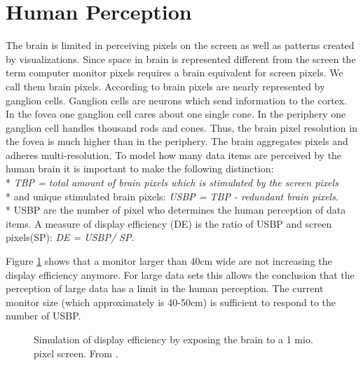\section{Human Perception} \label{perception}
The brain is limited in perceiving pixels on the screen as well as patterns created by visualizations. Since space in brain is represented different from the screen the term computer monitor pixels requires a brain equivalent for screen pixels. We call them brain pixels. According to  \cite{Ware2012a} brain pixels are nearly represented by ganglion cells. Ganglion cells are neurons which send information to the cortex. In the fovea one ganglion cell cares about one single cone. In the periphery one ganglion cell handles thousand rods and cones. Thus, the brain pixel resolution in the fovea is much higher than in the periphery. The brain aggregates pixels and adheres multi-resolution. 
To model how many data items are perceived by the human brain it is important to make the following distinction: 
\\*
\textit{TBP = total amount of brain pixels which is stimulated by the screen pixels}\\*
and unique stimulated brain pixels: \textit{USBP = TBP - redundant brain pixels}.\\*
USBP are the number of pixel who determines the human perception of data items. A measure of display efficiency (DE) is the ratio of USBP and screen pixels(SP): \textit{DE = USBP/ SP}.

Figure \ref{fig:DE} shows that a monitor larger than 40cm wide are not increasing the display efficiency anymore. For large data sets this allows the conclusion that the perception of large data has a limit in the human perception. The current monitor size (which approximately is  40-50cm) is sufficient to respond to the number of USBP.

\begin{figure}[H]
    \centering
    \caption{Simulation of display efficiency by exposing the brain to a 1 mio. pixel screen. From  \cite{Ware2012a}.}
    \label{fig:DE}
\end{figure}

